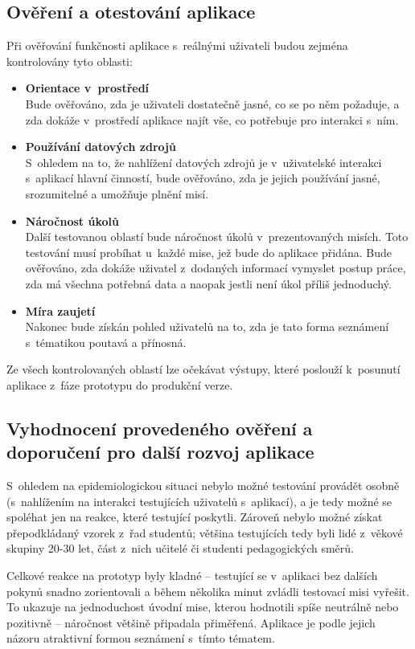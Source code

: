 \subsection{Ověření a otestování aplikace}
Při ověřování funkčnosti aplikace s~reálnými uživateli budou zejména kontrolovány tyto oblasti: 

\begin{itemize}
	\item \textbf{Orientace v~prostředí}\\
		Bude ověřováno, zda je uživateli dostatečně jasné, co se po něm požaduje, a zda dokáže v~prostředí aplikace najít vše, co potřebuje pro interakci s~ním. 
	\item \textbf{Používání datových zdrojů}\\
		S~ohledem na to, že nahlížení datových zdrojů je v~uživatelské interakci s~aplikací hlavní činností, bude ověřováno, zda je jejich používání jasné, srozumitelné a umožňuje plnění misí. 
	\item \textbf{Náročnost úkolů}\\
		Další testovanou oblastí bude náročnost úkolů v~prezentovaných misích. Toto testování musí probíhat u~každé mise, jež bude do aplikace přidána. Bude ověřováno, zda dokáže uživatel z~dodaných informací vymyslet postup práce, zda má všechna potřebná data a naopak jestli není úkol příliš jednoduchý.
	\item \textbf{Míra zaujetí}\\
		Nakonec bude získán pohled uživatelů na to, zda je tato forma seznámení s~tématikou poutavá a přínosná.
\end{itemize}

Ze všech kontrolovaných oblastí lze očekávat výstupy, které poslouží k~posunutí aplikace z~fáze prototypu do produkční verze.


\subsection{Vyhodnocení provedeného ověření a doporučení pro další rozvoj aplikace}
S~ohledem na epidemiologickou situaci nebylo možné testování provádět osobně (s~nahlížením na interakci testujících uživatelů s~aplikací), a je tedy možné se spoléhat jen na reakce, které testující poskytli. Zároveň nebylo možné získat přepodkládaný vzorek z~řad studentů; většina testujících tedy byli lidé z~věkové skupiny 20-30 let, část z~nich učitelé či studenti pedagogických směrů.

Celkové reakce na prototyp byly kladné -- testující se v~aplikaci bez dalších pokynů snadno zorientovali a během několika minut zvládli testovací misi vyřešit. To ukazuje na jednoduchost úvodní mise, kterou hodnotili spíše neutrálně nebo pozitivně -- náročnost většině připadala přiměřená.
Aplikace je podle jejich názoru atraktivní formou seznámení s~tímto tématem.

